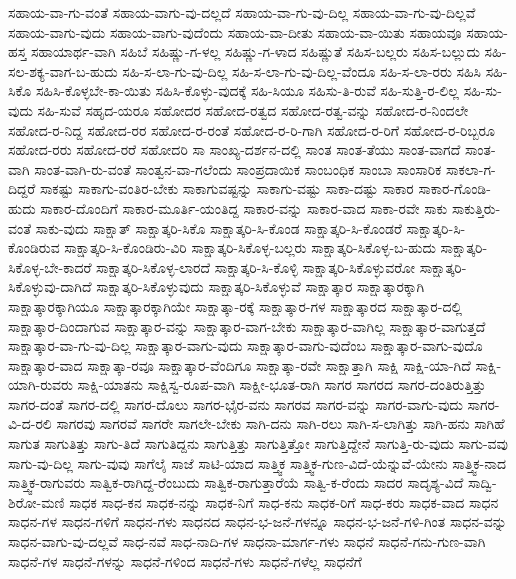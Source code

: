 {ಸಹಾಯ-ವಾ-ಗು-ವಂತೆ
ಸಹಾಯ-ವಾಗು-ವು-ದಲ್ಲದೆ
ಸಹಾಯ-ವಾ-ಗು-ವು-ದಿಲ್ಲ
ಸಹಾಯ-ವಾ-ಗು-ವು-ದಿಲ್ಲವೆ
ಸಹಾಯ-ವಾಗು-ವುದು
ಸಹಾಯ-ವಾಗು-ವುದೆಂದು
ಸಹಾಯ-ವಾ-ದೀತು
ಸಹಾಯ-ವಾ-ಯಿತು
ಸಹಾಯವೂ
ಸಹಾಯ-ಹಸ್ತ
ಸಹಾಯಾರ್ಥ-ವಾಗಿ
ಸಹಿಬೆ
ಸಹಿಷ್ಣು-ಗ-ಳಲ್ಲ
ಸಹಿಷ್ಣು-ಗ-ಳಾದ
ಸಹಿಷ್ಣುತೆ
ಸಹಿಸ-ಬಲ್ಲರು
ಸಹಿಸ-ಬಲ್ಲುದು
ಸಹಿ-ಸಲ-ಶಕ್ಯ-ವಾಗ-ಬ-ಹುದು
ಸಹಿ-ಸ-ಲಾ-ಗು-ವು-ದಿಲ್ಲ
ಸಹಿ-ಸ-ಲಾ-ಗು-ವು-ದಿಲ್ಲ-ವೆಂದೂ
ಸಹಿ-ಸ-ಲಾ-ರರು
ಸಹಿಸಿ
ಸಹಿ-ಸಿಕೊ
ಸಹಿಸಿ-ಕೊಳ್ಳಬೇ-ಕಾ-ಯಿತು
ಸಹಿಸಿ-ಕೊಳ್ಳು-ವುದಕ್ಕೆ
ಸಹಿ-ಸಿಯೂ
ಸಹಿಸು-ತಿ-ರುವೆ
ಸಹಿ-ಸುತ್ತಿ-ರ-ಲಿಲ್ಲ
ಸಹಿ-ಸು-ವುದು
ಸಹಿ-ಸುವೆ
ಸಹೃದ-ಯರೂ
ಸಹೋದರ
ಸಹೋದ-ರತ್ವದ
ಸಹೋದ-ರತ್ವ-ವನ್ನು
ಸಹೋದ-ರ-ನಿಂದಲೇ
ಸಹೋದ-ರ-ನಿದ್ದ
ಸಹೋದ-ರರ
ಸಹೋದ-ರ-ರಂತೆ
ಸಹೋದ-ರ-ರಿ-ಗಾಗಿ
ಸಹೋದ-ರ-ರಿಗೆ
ಸಹೋದ-ರ-ರಿಬ್ಬರೂ
ಸಹೋದ-ರರು
ಸಹೋದ-ರರೆ
ಸಹೋದರಿ
ಸಾ
ಸಾಂಖ್ಯ-ದರ್ಶನ-ದಲ್ಲಿ
ಸಾಂತ
ಸಾಂತ-ತೆಯು
ಸಾಂತ-ವಾಗದೆ
ಸಾಂತ-ವಾಗಿ
ಸಾಂತ-ವಾಗಿ-ರು-ವಂತೆ
ಸಾಂತ್ವನ-ವಾ-ಗಲೆಂದು
ಸಾಂಪ್ರದಾಯಿಕ
ಸಾಂಬಂಧಿಕ
ಸಾಂಬಾ
ಸಾಂಸಾರಿಕ
ಸಾಕಲಾ-ಗ-ದಿದ್ದರೆ
ಸಾಕಷ್ಟು
ಸಾಕಾಗು-ವಂತಿರ-ಬೇಕು
ಸಾಕಾಗುವಷ್ಟನ್ನು
ಸಾಕಾಗು-ವಷ್ಟು
ಸಾಕಾ-ದಷ್ಟು
ಸಾಕಾರ
ಸಾಕಾರ-ಗೊಂಡಿ-ಹುದು
ಸಾಕಾರ-ದೊಂದಿಗೆ
ಸಾಕಾರ-ಮೂರ್ತಿ-ಯಂತಿದ್ದ
ಸಾಕಾರ-ವನ್ನು
ಸಾಕಾರ-ವಾದ
ಸಾಕಾ-ರವೇ
ಸಾಕು
ಸಾಕುತ್ತಿರು-ವಂತೆ
ಸಾಕು-ವುದು
ಸಾಕ್ಷಾತ್
ಸಾಕ್ಷಾತ್ಕರಿ-ಸಿಕೊ
ಸಾಕ್ಷಾತ್ಕರಿ-ಸಿ-ಕೊಂಡ
ಸಾಕ್ಷಾತ್ಕರಿ-ಸಿ-ಕೊಂಡರೆ
ಸಾಕ್ಷಾತ್ಕರಿ-ಸಿ-ಕೊಂಡಿರುವ
ಸಾಕ್ಷಾತ್ಕರಿ-ಸಿ-ಕೊಂಡಿರು-ವಿರಿ
ಸಾಕ್ಷಾತ್ಕರಿ-ಸಿಕೊಳ್ಳ-ಬಲ್ಲರು
ಸಾಕ್ಷಾತ್ಕರಿ-ಸಿಕೊಳ್ಳ-ಬ-ಹುದು
ಸಾಕ್ಷಾತ್ಕರಿ-ಸಿಕೊಳ್ಳ-ಬೇ-ಕಾದರೆ
ಸಾಕ್ಷಾತ್ಕರಿ-ಸಿಕೊಳ್ಳ-ಲಾರದೆ
ಸಾಕ್ಷಾತ್ಕರಿ-ಸಿ-ಕೊಳ್ಳಿ
ಸಾಕ್ಷಾತ್ಕರಿ-ಸಿಕೊಳ್ಳುವರೋ
ಸಾಕ್ಷಾತ್ಕರಿ-ಸಿಕೊಳ್ಳುವು-ದಾಗಿದೆ
ಸಾಕ್ಷಾತ್ಕರಿ-ಸಿಕೊಳ್ಳುವುದು
ಸಾಕ್ಷಾತ್ಕರಿ-ಸಿಕೊಳ್ಳುವೆ
ಸಾಕ್ಷಾತ್ಕಾರ
ಸಾಕ್ಷಾತ್ಕಾರಕ್ಕಾಗಿ
ಸಾಕ್ಷಾತ್ಕಾರಕ್ಕಾಗಿಯೂ
ಸಾಕ್ಷಾತ್ಕಾರಕ್ಕಾಗಿಯೇ
ಸಾಕ್ಷಾತ್ಕಾ-ರಕ್ಕೆ
ಸಾಕ್ಷಾತ್ಕಾರ-ಗಳ
ಸಾಕ್ಷಾತ್ಕಾರದ
ಸಾಕ್ಷಾತ್ಕಾರ-ದಲ್ಲಿ
ಸಾಕ್ಷಾತ್ಕಾರ-ದಿಂದಾಗುವ
ಸಾಕ್ಷಾತ್ಕಾರ-ವನ್ನು
ಸಾಕ್ಷಾತ್ಕಾರ-ವಾಗ-ಬೇಕು
ಸಾಕ್ಷಾತ್ಕಾರ-ವಾಗಿಲ್ಲ
ಸಾಕ್ಷಾತ್ಕಾರ-ವಾಗುತ್ತದೆ
ಸಾಕ್ಷಾತ್ಕಾರ-ವಾ-ಗು-ವು-ದಿಲ್ಲ
ಸಾಕ್ಷಾತ್ಕಾರ-ವಾಗು-ವುದು
ಸಾಕ್ಷಾತ್ಕಾರ-ವಾಗು-ವುದೆಂಬ
ಸಾಕ್ಷಾತ್ಕಾರ-ವಾಗು-ವುದೊ
ಸಾಕ್ಷಾತ್ಕಾರ-ವಾದ
ಸಾಕ್ಷಾತ್ಕಾ-ರವೂ
ಸಾಕ್ಷಾತ್ಕಾರ-ವೆಂದಿಗೂ
ಸಾಕ್ಷಾತ್ಕಾ-ರವೇ
ಸಾಕ್ಷಾತ್ತಾಗಿ
ಸಾಕ್ಷಿ
ಸಾಕ್ಷಿ-ಯಾ-ಗಿದೆ
ಸಾಕ್ಷಿ-ಯಾಗಿ-ರುವರು
ಸಾಕ್ಷಿ-ಯಾತನು
ಸಾಕ್ಷಿಸ್ವ-ರೂಪ-ವಾಗಿ
ಸಾಕ್ಷೀ-ಭೂತ-ರಾಗಿ
ಸಾಗರ
ಸಾಗರದ
ಸಾಗರ-ದಂತಿರುತ್ತಿತ್ತು
ಸಾಗರ-ದಂತೆ
ಸಾಗರ-ದಲ್ಲಿ
ಸಾಗರ-ದೊಲು
ಸಾಗರ-ಭೈರ-ವನು
ಸಾಗರವ
ಸಾಗರ-ವನ್ನು
ಸಾಗರ-ವಾಗು-ವುದು
ಸಾಗರ-ವಿ-ದ-ರಲಿ
ಸಾಗರವು
ಸಾಗರವೆ
ಸಾಗರೇ
ಸಾಗಲೇ-ಬೇಕು
ಸಾಗಿ-ದನು
ಸಾಗಿ-ರಲು
ಸಾಗಿ-ಸ-ಲಾಗಿತ್ತು
ಸಾಗಿ-ಹನು
ಸಾಗಿಹೆ
ಸಾಗುತ
ಸಾಗುತಿತ್ತು
ಸಾಗು-ತಿದೆ
ಸಾಗುತಿದ್ದನು
ಸಾಗುತ್ತಿತ್ತು
ಸಾಗುತ್ತಿತ್ತೋ
ಸಾಗುತ್ತಿದ್ದೇನೆ
ಸಾಗುತ್ತಿ-ರು-ವುದು
ಸಾಗು-ವವು
ಸಾಗು-ವು-ದಿಲ್ಲ
ಸಾಗು-ವುವು
ಸಾಗೆಲೈ
ಸಾಜೆ
ಸಾಟಿ-ಯಾದ
ಸಾತ್ತ್ವಿಕ
ಸಾತ್ತ್ವಿಕ-ಗುಣ-ವಿದೆ-ಯೆನ್ನುವೆ-ಯೇನು
ಸಾತ್ತ್ವಿಕ-ನಾದ
ಸಾತ್ತ್ವಿಕ-ರಾಗುವರು
ಸಾತ್ವಿಕ-ರಾಗಿದ್ದ-ರೆಂಬುದು
ಸಾತ್ವಿಕ-ರಾಗುತ್ತಾರೆಯೆ
ಸಾತ್ವಿ-ಕ-ರೆಂದು
ಸಾದರ
ಸಾದೃಶ್ಯ-ವಿದೆ
ಸಾದ್ವಿ-ಶಿರೋ-ಮಣಿ
ಸಾಧಕ
ಸಾಧ-ಕನ
ಸಾಧಕ-ನನ್ನು
ಸಾಧಕ-ನಿಗೆ
ಸಾಧ-ಕನು
ಸಾಧಕ-ರಿಗೆ
ಸಾಧ-ಕರು
ಸಾಧಕ-ವಾದ
ಸಾಧನ
ಸಾಧನ-ಗಳ
ಸಾಧನ-ಗಳಿಗೆ
ಸಾಧನ-ಗಳು
ಸಾಧನದ
ಸಾಧನ-ಭ-ಜನೆ-ಗಳನ್ನೂ
ಸಾಧನ-ಭ-ಜನೆ-ಗಳಿ-ಗಿಂತ
ಸಾಧನ-ವನ್ನು
ಸಾಧನ-ವಾಗು-ವು-ದಲ್ಲವೆ
ಸಾಧ-ನವೆ
ಸಾಧ-ನಾದಿ-ಗಳ
ಸಾಧನಾ-ಮಾರ್ಗ-ಗಳು
ಸಾಧನೆ
ಸಾಧನೆ-ಗನು-ಗುಣ-ವಾಗಿ
ಸಾಧನೆ-ಗಳ
ಸಾಧನೆ-ಗಳನ್ನು
ಸಾಧನೆ-ಗಳಿಂದ
ಸಾಧನೆ-ಗಳು
ಸಾಧನೆ-ಗಳೆಲ್ಲ
ಸಾಧನೆಗೆ
}
